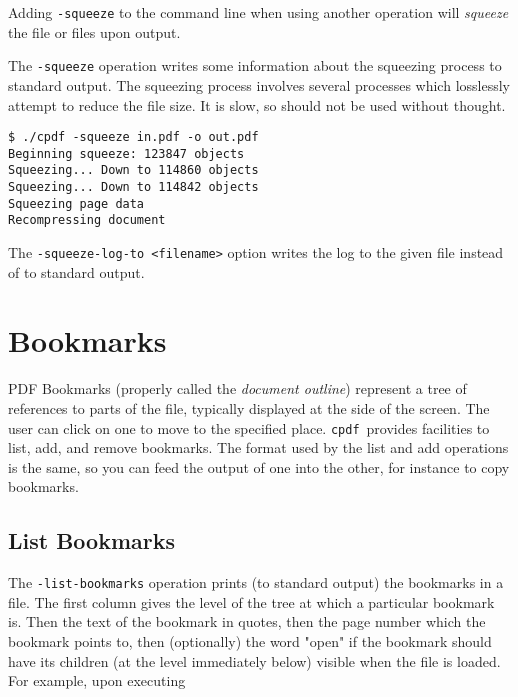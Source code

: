 \documentclass{book}
\newcommand{\cpdf}{\texttt{cpdf}}
\begin{document}
\noindent{}
  \noindent Adding \texttt{-squeeze} to the command line when using another operation will \textit{squeeze} the file or files upon output.
  
  The \texttt{-squeeze} operation writes some information about the squeezing process to standard output. The squeezing process involves several processes which losslessly attempt to reduce the file size. It is slow, so should not be used without thought.

\begin{verbatim}
$ ./cpdf -squeeze in.pdf -o out.pdf
Beginning squeeze: 123847 objects
Squeezing... Down to 114860 objects
Squeezing... Down to 114842 objects
Squeezing page data
Recompressing document\end{verbatim}

The \texttt{-squeeze-log-to <filename>} option writes the log to the given file instead of to standard output.



\chapter{Bookmarks}
\noindent{}
  PDF Bookmarks (properly called the \textit{document outline}) represent a tree
of references to parts of the file, typically displayed at the side of the
screen. The user can click on one to move to the specified place. \cpdf\ provides
facilities to list, add, and remove bookmarks. The format used by the list and
add operations is the same, so you can feed the output of one into the other,
for instance to copy bookmarks.

  \section{List Bookmarks}
  The \texttt{-list-bookmarks} operation prints (to standard output) the
bookmarks in a file. The first column gives the level of the tree at which a
particular bookmark is. Then the text of the bookmark in quotes, then the page
number which the bookmark points to, then (optionally) the word "open" if the
bookmark should have its children (at the level immediately below) visible when
the file is loaded. For example, upon executing
\noindent{}
\end{document}
